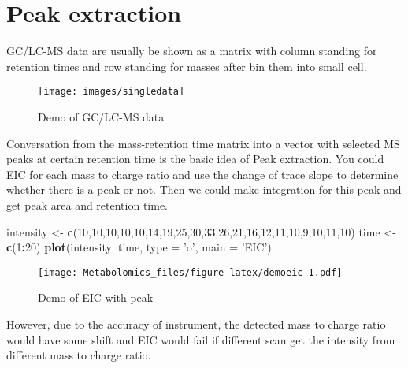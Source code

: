 \documentclass[
]{book}
\newenvironment{Shaded}{\begin{snugshade}}{\end{snugshade}}
\newcommand{\DataTypeTok}[1]{\textcolor[rgb]{0.13,0.29,0.53}{#1}}
\newcommand{\DecValTok}[1]{\textcolor[rgb]{0.00,0.00,0.81}{#1}}
\newcommand{\KeywordTok}[1]{\textcolor[rgb]{0.13,0.29,0.53}{\textbf{#1}}}
\newcommand{\NormalTok}[1]{#1}
\newcommand{\OperatorTok}[1]{\textcolor[rgb]{0.81,0.36,0.00}{\textbf{#1}}}
\newcommand{\StringTok}[1]{\textcolor[rgb]{0.31,0.60,0.02}{#1}}
\begin{document}
\hypertarget{peak-extraction}{%
\section{Peak extraction}\label{peak-extraction}}

GC/LC-MS data are usually be shown as a matrix with column standing for retention times and row standing for masses after bin them into small cell.

\begin{figure}
\texttt{[image: images/singledata]} \caption{Demo of GC/LC-MS data}\label{fig:singledata}
\end{figure}

Conversation from the mass-retention time matrix into a vector with selected MS peaks at certain retention time is the basic idea of Peak extraction. You could EIC for each mass to charge ratio and use the change of trace slope to determine whether there is a peak or not. Then we could make integration for this peak and get peak area and retention time.

\begin{Shaded}
\begin{Highlighting}[]
\NormalTok{intensity <-}\StringTok{ }\KeywordTok{c}\NormalTok{(}\DecValTok{10}\NormalTok{,}\DecValTok{10}\NormalTok{,}\DecValTok{10}\NormalTok{,}\DecValTok{10}\NormalTok{,}\DecValTok{10}\NormalTok{,}\DecValTok{14}\NormalTok{,}\DecValTok{19}\NormalTok{,}\DecValTok{25}\NormalTok{,}\DecValTok{30}\NormalTok{,}\DecValTok{33}\NormalTok{,}\DecValTok{26}\NormalTok{,}\DecValTok{21}\NormalTok{,}\DecValTok{16}\NormalTok{,}\DecValTok{12}\NormalTok{,}\DecValTok{11}\NormalTok{,}\DecValTok{10}\NormalTok{,}\DecValTok{9}\NormalTok{,}\DecValTok{10}\NormalTok{,}\DecValTok{11}\NormalTok{,}\DecValTok{10}\NormalTok{)}
\NormalTok{time <-}\StringTok{ }\KeywordTok{c}\NormalTok{(}\DecValTok{1}\OperatorTok{:}\DecValTok{20}\NormalTok{)}
\KeywordTok{plot}\NormalTok{(intensity}\OperatorTok{~}\NormalTok{time, }\DataTypeTok{type =} \StringTok{'o'}\NormalTok{, }\DataTypeTok{main =} \StringTok{'EIC'}\NormalTok{)}
\end{Highlighting}
\end{Shaded}

\begin{figure}
\centering
\texttt{[image: Metabolomics\_files/figure-latex/demoeic-1.pdf]}
\caption{\label{fig:demoeic}Demo of EIC with peak}
\end{figure}

However, due to the accuracy of instrument, the detected mass to charge ratio would have some shift and EIC would fail if different scan get the intensity from different mass to charge ratio.
\end{document}
